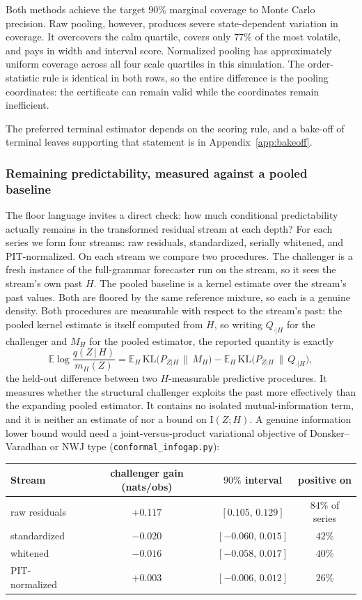 \documentclass[11pt]{article}
\theoremstyle{remark}
\newcommand{\E}{\mathbb{E}}
\newcommand{\KL}{\mathrm{KL}}
\newcommand{\I}{\mathrm{I}}
\newcommand{\given}{\,|\,}
\begin{document}
Both methods achieve the target $90\%$ marginal coverage to Monte Carlo precision. Raw
pooling, however, produces severe state-dependent variation in coverage. It overcovers the
calm quartile, covers only $77\%$ of the most volatile, and pays in width and interval
score.
Normalized pooling has approximately uniform coverage across all four scale quartiles in this
simulation. The order-statistic rule is
identical in both rows, so
the entire difference is the pooling coordinates: the certificate can remain valid while the
coordinates remain inefficient.

The preferred terminal estimator depends on the scoring rule, and a bake-off of terminal
leaves supporting that statement is in Appendix~\ref{app:bakeoff}.

\subsubsection*{Remaining predictability, measured against a pooled baseline}

The floor language invites a direct check: how much conditional predictability actually
remains in the transformed residual stream at each depth? For each series we form four
streams: raw residuals, standardized, serially whitened, and PIT-normalized. On each stream
we compare two procedures. The challenger is a fresh instance of the full-grammar forecaster
run on the stream, so it sees the stream's own past $H$. The pooled baseline is a kernel
estimate over the stream's past values. Both are floored by the same reference mixture, so
each is a genuine density. Both procedures are measurable with respect to the stream's past: the pooled
kernel estimate is itself computed from $H$, so writing $Q_{\cdot|H}$ for the challenger and
$M_H$ for the pooled estimator, the reported quantity is exactly
\[
\E\log\frac{q(Z\given H)}{m_H(Z)}
=\E_H\,\KL\big(P_{Z|H}\,\|\,M_H\big)-\E_H\,\KL\big(P_{Z|H}\,\|\,Q_{\cdot|H}\big),
\]
the held-out difference between two $H$-measurable predictive procedures. It measures whether
the structural challenger exploits the past more effectively than the expanding pooled
estimator. It contains no isolated mutual-information term, and it is neither an estimate of
nor a bound on $\I(Z;H)$. A genuine information lower bound would need a joint-versus-product
variational objective of Donsker--Varadhan or NWJ type
(\texttt{conformal\_infogap.py}):

\begin{center}
\small
\begin{tabular}{lccc}
\toprule
Stream & challenger gain (nats/obs) & $90\%$ interval & positive on\\
\midrule
raw residuals & $+0.117$ & $[0.105,\,0.129]$ & $84\%$ of series\\
standardized & $-0.020$ & $[-0.060,\,0.015]$ & $42\%$\\
whitened & $-0.016$ & $[-0.058,\,0.017]$ & $40\%$\\
PIT-normalized & $+0.003$ & $[-0.006,\,0.012]$ & $26\%$\\
\bottomrule
\end{tabular}
\end{center}
\end{document}
